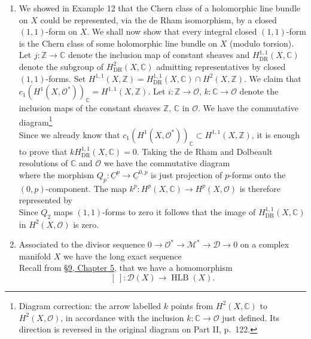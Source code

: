 \begin{enumerate}[start=10]
\[\begin{aligned}
\\&=\sum_{i=1}^n n_i,\quad\text{by the residue theorem.}\\
&=\deg(L).
\end{aligned}
\]
\item We showed in Example 12 that the Chern class of a holomorphic line bundle on $X$ could be represented, via the de Rham isomorphism, by a closed $(1,1)$-form on $X$. We shall now show that every integral closed $(1,1)$-form is the Chern class of some holomorphic line bundle on $X$ (modulo torsion). Let $j:\mathbb Z\to\mathbb C$ denote the inclusion map of constant sheaves and $H^{1,1}_{\mathrm{DR}}(X,\mathbb C)$ denote the subgroup of $H^2_{\mathrm{DR}}(X,\mathbb C)$ admitting representatives by closed $(1,1)$-forms. Set $H^{1,1}(X,\mathbb Z)=H^{1,1}_{\mathrm{DR}}(X,\mathbb C)\cap H^2(X,\mathbb Z)$. We claim that $c_1(H^1(X,\mathcal O^*))_{\mathbb C}=H^{1,1}(X,\mathbb Z)$. Let $i:\mathbb Z\to\mathcal O$, $k:\mathbb C\to\mathcal O$ denote the inclusion maps of the constant sheaves $\mathbb Z$, $\mathbb C$ in $\mathcal O$. We have the commutative diagram\footnote{Diagram correction: the arrow labelled $k$ points from $H^2(X,\mathbb C)$ to $H^2(X,\mathcal O)$, in accordance with the inclusion $k:\mathbb C\to\mathcal O$ just defined. Its direction is reversed in the original diagram on Part II, p.~122.}
\[

\]
Since we already know that $c_1(H^1(X,\mathcal O^*))_{\mathbb C}\subset H^{1,1}(X,\mathbb Z)$, it is enough to prove that $kH^{1,1}_{\mathrm{DR}}(X,\mathbb C)=0$. Taking the de Rham and Dolbeault resolutions of $\mathbb C$ and $\mathcal O$ we have the commutative diagram
\[

\]
where the morphism $Q_p:\underline C^p\to\underline C^{0,p}$ is just projection of $p$-forms onto the $(0,p)$-component. The map $k^p:H^p(X,\mathbb C)\to H^p(X,\mathcal O)$ is therefore represented by
\[

\]
Since $Q_2$ maps $(1,1)$-forms to zero it follows that the image of $H^{1,1}_{\mathrm{DR}}(X,\mathbb C)$ in $H^2(X,\mathcal O)$ is zero.
\item Associated to the divisor sequence $0\to\mathcal O^*\to\mathcal M^*\to\mathcal D\to0$ on a complex manifold $X$ we have the long exact sequence
\[

\]
Recall from \hyperref[sec:5:9]{\S9, Chapter 5}, that we have a homomorphism
\[
[\ ]:\mathcal D(X)\to\operatorname{HLB}(X).
\]
\end{enumerate}
